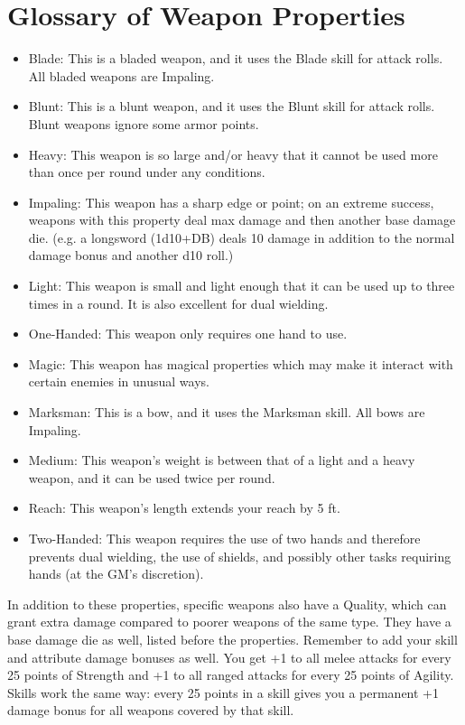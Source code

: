 \documentclass[12pt]{book}
\begin{document}
\section{Glossary of Weapon Properties}
\begin{itemize}
	\item Blade: This is a bladed weapon, and it uses the Blade skill for attack rolls. All bladed weapons are Impaling.
	\item Blunt: This is a blunt weapon, and it uses the Blunt skill for attack rolls. Blunt weapons ignore some armor points.
	\item Heavy: This weapon is so large and/or heavy that it cannot be used more than once per round under any conditions.
	\item Impaling: This weapon has a sharp edge or point; on an extreme success, weapons with this property deal max damage and then another base damage die. (e.g. a longsword (1d10+DB) deals 10 damage in addition to the normal damage bonus and another d10 roll.)
	\item Light: This weapon is small and light enough that it can be used up to three times in a round. It is also excellent for dual wielding.
	\item One-Handed: This weapon only requires one hand to use.
	\item Magic: This weapon has magical properties which may make it interact with certain enemies in unusual ways.
	\item Marksman: This is a bow, and it uses the Marksman skill. All bows are Impaling.
	\item Medium: This weapon's weight is between that of a light and a heavy weapon, and it can be used twice per round.
	\item Reach: This weapon's length extends your reach by 5 ft.
	\item Two-Handed: This weapon requires the use of two hands and therefore prevents dual wielding, the use of shields, and possibly other tasks requiring hands (at the GM's discretion).
\end{itemize}

In addition to these properties, specific weapons also have a Quality, which can grant extra damage compared to poorer weapons of the same type. They have a base damage die as well, listed before the properties. Remember to add your skill and attribute damage bonuses as well. You get +1 to all melee attacks for every 25 points of Strength and +1 to all ranged attacks for every 25 points of Agility. Skills work the same way: every 25 points in a skill gives you a permanent +1 damage bonus for all weapons covered by that skill.
\end{document}
